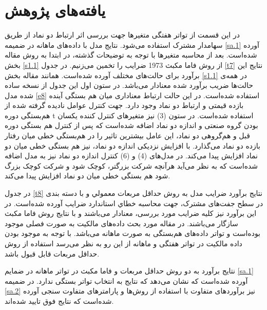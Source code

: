 \documentclass[12pt]{article}
\begin{document}
     \FloatBarrier
 
 
\section{یافته‌های پژوهش}
در این قسمت از تواتر هفتگی متغیر‌ها جهت بررسی اثر ارتباط دو نماد از طریق سهامدار مشترک استفاده می‌شود. نتایج مدل با داده‌های ماهانه در ضمیمه 
\ref{sa.1}
آورده شده‌است.
بعد از محاسبه متغیر‌ها با توجه به توضیحات گذشته، در ابتدا به روش مقاله  بخش 
\ref{s1.1}
از روش فاما مکبث 1973 
ضرایب را تخمین می‌زنیم. در جدول 
\ref{t7} 
نتایج این برآورد  
برای حالت‌های مختلف آورده شده‌است. همانند مقاله بخش 
\ref{s1.1}
در همه‌ی حالت‌ها ضریب برآورد شده معنا‌دار می‌باشد. در ستون اول این جدول از نسخه ساده شده مدل 
\ref{e8}
استفاده شده‌است. در این حالت ارتباط معنا‌داری میان هم بستگی آینده بازده قیمتی و ارتباط دو نماد وجود دارد. جهت کنترل عوامل نادیده گرفته شده از هم‌بستگی دوره t استفاده شده‌است. در ستون (3) نیز متغیر‌های کنترل کننده یکسان بودن گروه صنعتی و اندازه دو نماد اضافه شده‌است که پس از کنترل هم بستگی دوره قبل و هم‌گروهی دو نماد، این عامل بیشترین تاثیر را در هم‌بستگی خطی میان رفتار بازده دو نماد می‌گذارد. با افزایش نزدیکی اندازه دو نماد، نیز هم بستگی خطی میان دو نماد افزایش پیدا می‌کند. در مدل‌های (4) و (6) کنترل اندازه دو نماد نیز به مدل اضافه شده‌است که به نظر می‌آید هرآنچه شرکت بزرگتر، کوچک شود و شرکت کوچک بزرگ شود هم بستگی خطی میان دو نماد افزایش پیدا می‌کند. 

در جدول 
\ref{t8}
نتایج برآورد ضرایب مدل به روش حداقل مربعات معمولي و با
دسته بندی در سطح جفت‌های مشترک، جهت محاسبه خطاي استاندارد ضرايب آورده شده‌است. در این برآورد نیز کلیه ضرایب مورد بررسی، معنادار می‌باشند و با نتایج روش فاما مکبث سازگار می‌باشند.  در مقاله مورد بحث داده‌های مالکیت به صورت فصلی موجود بوده‌است و تواتر داده‌های هم‌بستگی به صورت ماهانه می‌باشد. با توجه به موجود بودن داده‌ مالکیت در تواتر هفتگی و ماهانه از این رو به نظر می‌رسد استفاده از روش حداقل مربعات قابل قبول باشد.

نتایج برآورد به دو روش حداقل مربعات و فاما مکبث در تواتر ماهانه در ضمایم
\ref{sa.1}
آورده شده‌است که نشان می‌دهد که نتایج به انتخاب تواتر بستگی ندارد.
 در ضمیمه 
\ref{sa.2}
نیز برآورد‌های متفاوت با استفاده از روش‌ها و پارامتر‌های متفاوت سنجی آورده شده‌است که نتایج فوق تایید شده‌اند.

\nopagebreak

\end{document}
